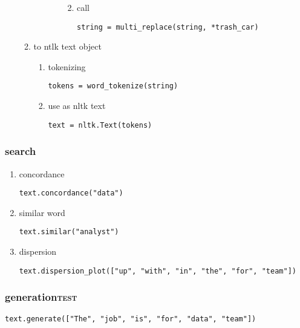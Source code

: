 \documentclass[11pt]{article}
\begin{document}
\begin{enumerate}
\begin{enumerate}
\begin{enumerate}
\begin{enumerate}
\begin{enumerate}
\begin{verbatim}
\end{verbatim}

\item call
\label{sec:orga58ab04}
\begin{verbatim}
string = multi_replace(string, *trash_car)
\end{verbatim}
\end{enumerate}
\end{enumerate}
\end{enumerate}


\item to ntlk text object
\label{sec:org50f8e28}
\begin{enumerate}
\item tokenizing
\label{sec:org641ee87}
\begin{verbatim}
tokens = word_tokenize(string)
\end{verbatim}

\item use as nltk text
\label{sec:org083024c}
\begin{verbatim}
text = nltk.Text(tokens)
\end{verbatim}
\end{enumerate}
\end{enumerate}
\end{enumerate}
\subsubsection{search}
\label{sec:orgb650981}
\begin{enumerate}
\item concordance
\label{sec:org3a0731b}
\begin{verbatim}
text.concordance("data")
\end{verbatim}
\item similar word
\label{sec:orgcb9bbce}
\begin{verbatim}
text.similar("analyst")
\end{verbatim}
\item dispersion
\label{sec:org120e34a}
\begin{verbatim}
text.dispersion_plot(["up", "with", "in", "the", "for", "team"])
\end{verbatim}
\end{enumerate}
\subsubsection{generation\hfill{}\textsc{test}}
\label{sec:org5bab624}
\begin{verbatim}
text.generate(["The", "job", "is", "for", "data", "team"])
\end{verbatim}
\end{document}
